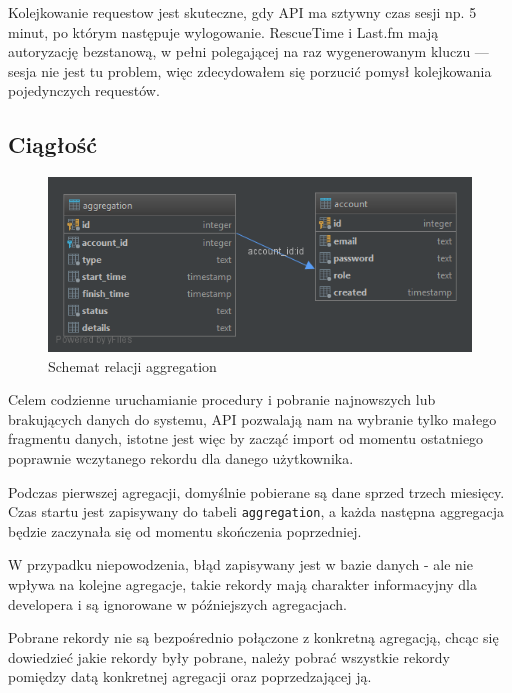 \documentclass[brudnopis]{xmgr}
\begin{document}
            Kolejkowanie requestow jest skuteczne, gdy API ma sztywny czas sesji np. 5 minut, po którym następuje wylogowanie.
            RescueTime i Last.fm mają autoryzację bezstanową,
            w pełni polegającej na raz wygenerowanym kluczu --- sesja nie jest tu problem,
            więc zdecydowałem się porzucić pomysł kolejkowania pojedynczych requestów.

        \subsection*{Ciągłość}

            \begin{figure}
                \centering
                \includegraphics[width=\textwidth]{fig/db-aggregation.png}
                \caption{Schemat relacji aggregation}
                \label{fig:db-aggregation}
            \end{figure}

            Celem codzienne uruchamianie procedury i pobranie najnowszych lub brakujących danych do systemu,
            API pozwalają nam na wybranie tylko małego fragmentu danych, istotne jest więc by zacząć import
            od momentu ostatniego poprawnie wczytanego rekordu dla danego użytkownika.

            Podczas pierwszej agregacji, domyślnie pobierane są dane sprzed trzech miesięcy.
            Czas startu jest zapisywany do tabeli \verb|aggregation|,
            a każda następna aggregacja będzie zaczynała się od momentu skończenia poprzedniej.

            W przypadku niepowodzenia, błąd zapisywany jest w bazie danych - ale nie wpływa na kolejne agregacje,
            takie rekordy mają charakter informacyjny dla developera i są ignorowane w późniejszych agregacjach.

            Pobrane rekordy nie są bezpośrednio połączone z konkretną agregacją,
            chcąc się dowiedzieć jakie rekordy były pobrane, należy pobrać wszystkie rekordy pomiędzy datą konkretnej agregacji oraz poprzedzającej ją.
\end{document}
